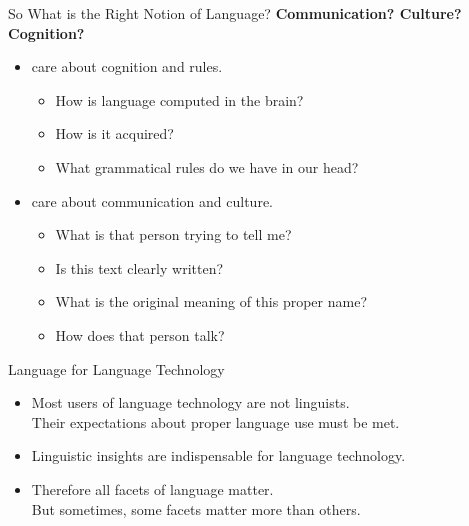\documentclass[xcolor={usenames,svgnames,x11names,dvipsnames,table}]{beamer}
\begin{document}
\begin{frame}{So What is the Right Notion of Language?}
    \textbf{Communication? Culture? Cognition?}

    \begin{itemize}
        \item {} care about cognition and rules.
            \begin{itemize}
                \item How is language computed in the brain?
                \item How is it acquired?
                \item What grammatical rules do we have in our head?
            \end{itemize}
        \item {} care about communication and culture.
            \begin{itemize}
                \item What is that person trying to tell me?
                \item Is this text clearly written?
                \item What is the original meaning of this proper name?
                \item How does that person talk?\\
            \end{itemize}
    \end{itemize}
\end{frame}

\begin{frame}{Language for Language Technology}
    \begin{itemize}
        \item Most users of language technology are not linguists.\\
            Their expectations about proper language use must be met.
        \item Linguistic insights are indispensable for language technology.
        \item Therefore all facets of language matter.\\
            But sometimes, some facets matter more than others.
    \end{itemize}
\end{frame}
\end{document}
